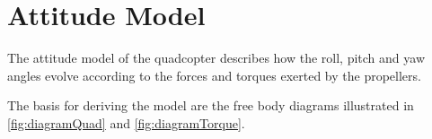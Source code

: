 \section{Attitude Model}
The attitude model of the quadcopter describes how the roll, pitch and yaw angles evolve according to the forces and torques exerted by the propellers. 

The basis for deriving the model are the free body diagrams illustrated in \autoref{fig:diagramQuad} and \ref{fig:diagramTorque}. 

%
%


